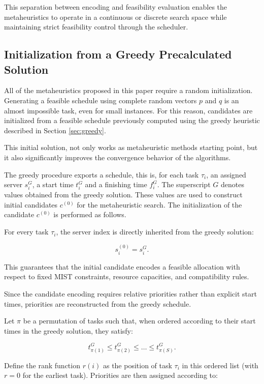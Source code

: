 \documentclass[11pt,a4paper]{article}
\begin{document}
This separation between encoding and feasibility evaluation enables the metaheuristics to operate in a continuous or discrete search space while maintaining strict feasibility control through the scheduler.

\subsection{Initialization from a Greedy Precalculated Solution}

All of the metaheuristics proposed in this paper require a random initialization. Generating a feasible schedule using complete random vectors $p$ and $q$ is an almost impossible task, even for small instances. For this reason, candidates are initialized from a feasible schedule previously computed using the greedy heuristic described in Section \ref{sec:greedy}.

This initial solution, not only works as metaheuristic methods starting point, but it also significantly improves the convergence behavior of the algorithms. 

The greedy procedure exports a schedule, this is, for each task $\tau_i$, an assigned server $s_i^{G}$, a start time $t_i^{G}$ and a finishing time $f_i^{G}$. The superscript $G$ denotes values obtained from the greedy solution. These values are used to construct initial candidates $c^{(0)}$ for the metaheuristic search. The initialization of the candidate $c^{(0)}$ is performed as follows.

For every task $\tau_i$, the server index is directly inherited from the greedy solution:

\[
s_i^{(0)} = s_i^{G}.
\]

This guarantees that the initial candidate encodes a feasible allocation with respect to fixed MIST constraints, resource capacities, and compatibility rules.

Since the candidate encoding requires relative priorities rather than explicit start times, priorities are reconstructed from the greedy schedule.

Let $\pi$ be a permutation of tasks such that, when ordered according to their start times in the greedy solution, they satisfy:

\[
t_{\pi(1)}^{G} \leq t_{\pi(2)}^{G} \leq \dots \leq t_{\pi(S)}^{G}.
\]

Define the rank function $r(i)$ as the position of task $\tau_i$ in this ordered list (with $r=0$ for the earliest task). Priorities are then assigned according to:
\end{document}
